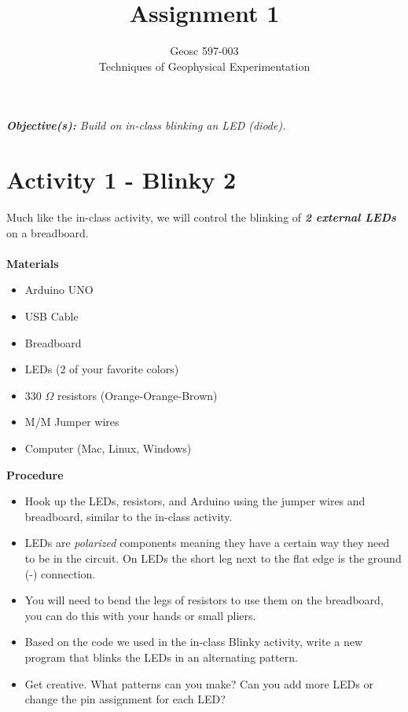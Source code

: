 \documentclass[10pt]{article}
\begin{document}

\title{Assignment 1}%
\author{Geosc 597-003\\
Techniques of Geophysical Experimentation} %

\maketitle

\textit{\textbf{Objective(s):}
Build on in-class blinking an LED (diode).}

\section*{Activity 1 - Blinky 2}

Much like the in-class activity, we will control the blinking of \textbf{\textit{2 external LEDs}} on a breadboard. \\ \\
\noindent\textbf{Materials}
\begin{multicols}{2}
	{\small \begin{itemize}
		\item Arduino UNO
		\item USB Cable
		\item Breadboard
		\item LEDs (2 of your favorite colors)
		\item 330 $ \Omega $ resistors (Orange-Orange-Brown)
		\item M/M Jumper wires
		\item Computer (Mac, Linux, Windows)
	\end{itemize}}  
\end{multicols}

\noindent\textbf{Procedure}

\begin{itemize}
	\item Hook up the LEDs, resistors, and Arduino using the jumper wires and breadboard, similar to the in-class activity.
	
	\item LEDs are \textit{polarized} components meaning they have a certain way they need to be in the circuit. On LEDs the short leg next to the flat edge is the ground (-) connection.
	
	\item You will need to bend the legs of resistors to use them on the breadboard, you can do this with your hands or small pliers.
	
	\item Based on the code we used in the in-class Blinky activity, write a new program that blinks the LEDs in an alternating pattern.
	
	\item Get creative. What patterns can you make? Can you add more LEDs or change the pin assignment for each LED?
\end{itemize}
\end{document}
